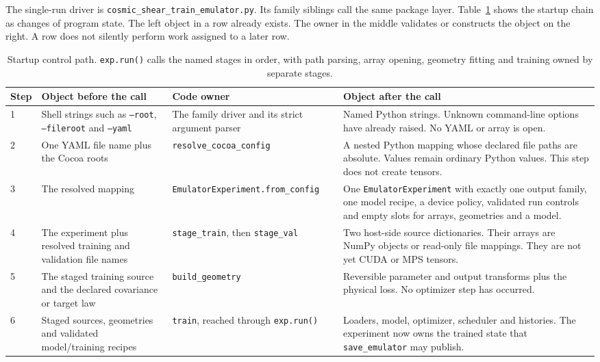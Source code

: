\documentclass[10pt,aps,prd,twocolumn,nofootinbib]{revtex4-2}
\newcommand{\code}[1]{\texttt{#1}}
\begin{document}
The single-run driver is \code{cosmic\_shear\_train\_emulator.py}.  Its
family siblings call the same package layer.  Table~\ref{tab:startup-control}
shows the startup chain as changes of program state.  The left object in a row
already exists.  The owner in the middle validates or constructs the object
on the right.  A row does not silently perform work assigned to a later row.

\begin{table}[t]
\centering
\begin{tabular}{p{}p{}p{}
                p{}}
\toprule
Step & Object before the call & Code owner & Object after the call \\
\midrule
1 & Shell strings such as \code{--root}, \code{--fileroot} and
    \code{--yaml}
  & The family driver and its strict argument parser
  & Named Python strings.  Unknown command-line options have already raised.
    No YAML or array is open.  \\
2 & One YAML file name plus the Cocoa roots
  & \code{resolve\_cocoa\_config}
  & A nested Python mapping whose declared file paths are absolute.  Values
    remain ordinary Python values.  This step does not create tensors.  \\
3 & The resolved mapping
  & \code{EmulatorExperiment.}\newline\code{from\_config}
  & One \code{EmulatorExperiment} with exactly one output family, one model
    recipe, a device policy, validated run controls and empty slots for
    arrays, geometries and a model.  \\
4 & The experiment plus resolved training and validation file names
  & \code{stage\_train}, then \code{stage\_val}
  & Two host-side source dictionaries.  Their arrays are NumPy objects or
    read-only file mappings.  They are not yet CUDA or MPS tensors.  \\
5 & The staged training source and the declared covariance or target law
  & \code{build\_geometry}
  & Reversible parameter and output transforms plus the physical loss.  No
    optimizer step has occurred.  \\
6 & Staged sources, geometries and validated model/training recipes
  & \code{train}, reached through \code{exp.run()}
  & Loaders, model, optimizer, scheduler and histories.  The experiment now
    owns the trained state that \code{save\_emulator} may publish.  \\
\bottomrule
\end{tabular}
\caption{Startup control path.  \code{exp.run()} calls the named stages in
order, with path parsing, array opening, geometry fitting and training owned by
separate stages.}
\label{tab:startup-control}
\end{table}
\end{document}
